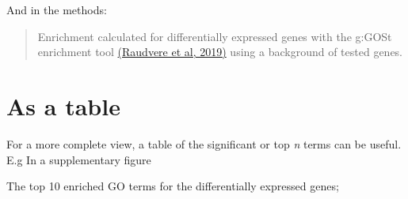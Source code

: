 \documentclass[
]{book}
\begin{document}
And in the methods:

\begin{quote}
Enrichment calculated for differentially expressed genes with the g:GOSt enrichment tool \href{https://academic.oup.com/nar/article/47/W1/W191/5486750}{(Raudvere et al, 2019)} using a background of tested genes.
\end{quote}

\section{As a table}\label{as-a-table}

For a more complete view, a table of the significant or top \emph{n} terms can be useful. E.g In a supplementary figure

The top 10 enriched GO terms for the differentially expressed genes;
\end{document}
